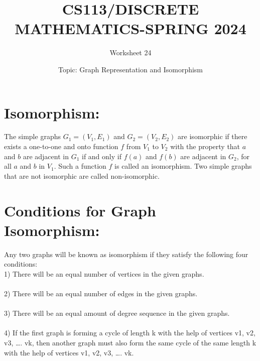 \documentclass{exam}
\title{CS113/DISCRETE MATHEMATICS-SPRING 2024}
\author{Worksheet 24}
\date{Topic: Graph Representation and Isomorphism}
\begin{document}
\maketitle
\vspace{5mm}
\begin{center}
\end{center}
\vspace{5mm}


\vspace{5mm}

\vspace{5mm}

\section{Isomorphism:}
The simple graphs \(G_1 = (V_1, E_1)\) and \(G_2 = (V_2, E_2)\) are isomorphic if there exists a one-to-one and onto function \(f\) from \(V_1\) to \(V_2\) with the property that \(a\) and \(b\) are adjacent in \(G_1\) if and only if \(f(a)\) and \(f(b)\) are adjacent in \(G_2\), for all \(a\) and \(b\) in \(V_1\). Such a function \(f\) is called an isomorphism. Two simple graphs that are not isomorphic are called non-isomorphic.

\section{Conditions for Graph Isomorphism:}
Any two graphs will be known as isomorphism if they satisfy the following four conditions:\\
1) There will be an equal number of vertices in the given graphs.\\
\\
2) There will be an equal number of edges in the given graphs.\\
\\
3) There will be an equal amount of degree sequence in the given graphs.\\
\\
4) If the first graph is forming a cycle of length k with the help of vertices {v1, v2, v3, …. vk}, then another graph must also form the same cycle of the same length k with the help of vertices {v1, v2, v3, …. vk}.\\
\end{document}
